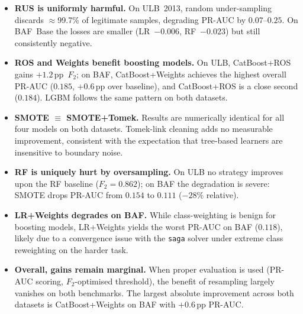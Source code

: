 \begin{itemize}
  \item \textbf{RUS is uniformly harmful.}
    On ULB~2013, random under-sampling discards $\approx$99.7\% of
    legitimate samples, degrading PR-AUC by $0.07$--$0.25$.
    On BAF~Base the losses are smaller (LR~$-0.006$, RF~$-0.023$) but
    still consistently negative.
  \item \textbf{ROS and Weights benefit boosting models.}
    On ULB, CatBoost+ROS gains $+1.2$\,pp~$F_2$; on BAF,
    CatBoost+Weights achieves the highest overall PR-AUC ($0.185$,
    $+0.6$\,pp over baseline), and CatBoost+ROS is a close second
    ($0.184$).
    LGBM follows the same pattern on both datasets.
  \item \textbf{SMOTE $\equiv$ SMOTE+Tomek.}
    Results are numerically identical for all four models on both datasets.
    Tomek-link cleaning adds no measurable improvement, consistent with the
    expectation that tree-based learners are insensitive to boundary noise.
  \item \textbf{RF is uniquely hurt by oversampling.}
    On ULB no strategy improves upon the RF baseline ($F_2 = 0.862$);
    on BAF the degradation is severe: SMOTE drops PR-AUC from $0.154$
    to $0.111$ ($-28\%$ relative).
  \item \textbf{LR+Weights degrades on BAF.}
    While class-weighting is benign for boosting models, LR+Weights
    yields the worst PR-AUC on BAF ($0.118$), likely due to a
    convergence issue with the \texttt{saga} solver under extreme
    class reweighting on the harder task.
  \item \textbf{Overall, gains remain marginal.}
    When proper evaluation is used (PR-AUC scoring, $F_2$-optimised
    threshold), the benefit of resampling largely vanishes on both
    benchmarks.
    The largest absolute improvement across both datasets is
    CatBoost+Weights on BAF with $+0.6$\,pp PR-AUC.
\end{itemize}



